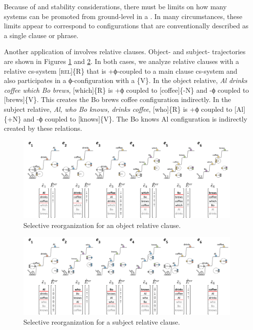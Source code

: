   Because of  and stability considerations, there must be limits on how many systems can be promoted from ground-level in a . In many circumstances, these limits appear to correspond to configurations that are conventionally described as a single clause or  phrase.

  Another application of  involves relative clauses. Ob\-ject- and subject- trajectories are shown in Figures {\ref{fig:4:52}} and {\ref{fig:4:53}}. In both cases, we analyze relative clauses with a relative cs-system [\textsc{rel}]\{R\} that is +ϕ-coupled to a main clause cs-system and also participates in a ϕ-con\-fig\-u\-ra\-tion with a  \{V\}. In the object relative, \textit{Al drinks coffee which Bo brews}, [which]\{R\} is +ϕ coupled to [coffee]\{-N\} and -ϕ coupled to [brews]\{V\}. This creates the {\textbar}Bo brews coffee{\textbar} configuration indirectly. In the subject relative, \textit{Al, who Bo knows, drinks coffee}, [who]\{R\} is +ϕ coupled to [Al]\{+N\} and -ϕ coupled to [knows]\{V\}. The {\textbar}Bo knows Al{\textbar} configuration is indirectly created by these relations.

  
\begin{figure}
\includegraphics[width=\textwidth]{figures/Tilsen-img102.png}
\caption{Selective reorganization for an object relative clause.}
\label{fig:4:52}
\end{figure}
 

  
\begin{figure}
\includegraphics[width=\textwidth]{figures/Tilsen-img103.png}
\caption{Selective reorganization for a subject relative clause.}
\label{fig:4:53}
\end{figure}
 

